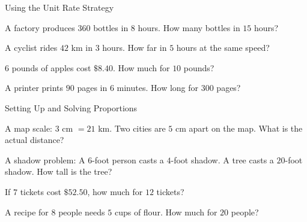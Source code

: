 \begin{practiceBox}{Using the Unit Rate Strategy}


\prob A factory produces $360$ bottles in $8$ hours. How many bottles in $15$ hours?
\answerBlank[3cm]

\prob A cyclist rides $42$ km in $3$ hours. How far in $5$ hours at the same speed?
\answerBlank[3cm]

\prob $6$ pounds of apples cost $\$8.40$. How much for $10$ pounds?
\answerBlank[3cm]

\prob A printer prints $90$ pages in $6$ minutes. How long for $300$ pages?
\answerBlank[3cm]

\end{practiceBox}

\begin{practiceBox}[funTeal]{Setting Up and Solving Proportions}


\prob A map scale: $3$ cm $= 21$ km. Two cities are $5$ cm apart on the map. What is the actual distance?
\answerBlank[3cm]

\prob A shadow problem: A $6$-foot person casts a $4$-foot shadow. A tree casts a $20$-foot shadow. How tall is the tree?
\answerBlank[3cm]

\prob If $7$ tickets cost $\$52.50$, how much for $12$ tickets?
\answerBlank[3cm]

\prob A recipe for $8$ people needs $5$ cups of flour. How much for $20$ people?
\answerBlank[3cm]

\end{practiceBox}

